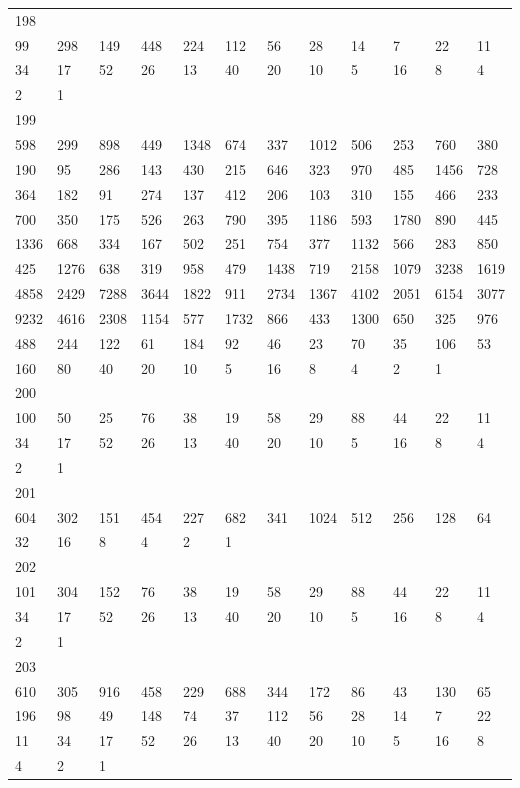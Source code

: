 \begin{longtable}{llllllllllll}
198&&&&&&&&&&&\\
99& 298& 149& 448& 224& 112& 56& 28& 14& 7& 22& 11\\
34& 17& 52& 26& 13& 40& 20& 10& 5& 16& 8& 4\\
2& 1& \\

199&&&&&&&&&&&\\
598& 299& 898& 449& 1348& 674& 337& 1012& 506& 253& 760& 380\\
190& 95& 286& 143& 430& 215& 646& 323& 970& 485& 1456& 728\\
364& 182& 91& 274& 137& 412& 206& 103& 310& 155& 466& 233\\
700& 350& 175& 526& 263& 790& 395& 1186& 593& 1780& 890& 445\\
1336& 668& 334& 167& 502& 251& 754& 377& 1132& 566& 283& 850\\
425& 1276& 638& 319& 958& 479& 1438& 719& 2158& 1079& 3238& 1619\\
4858& 2429& 7288& 3644& 1822& 911& 2734& 1367& 4102& 2051& 6154& 3077\\
9232& 4616& 2308& 1154& 577& 1732& 866& 433& 1300& 650& 325& 976\\
488& 244& 122& 61& 184& 92& 46& 23& 70& 35& 106& 53\\
160& 80& 40& 20& 10& 5& 16& 8& 4& 2& 1& \\

200&&&&&&&&&&&\\
100& 50& 25& 76& 38& 19& 58& 29& 88& 44& 22& 11\\
34& 17& 52& 26& 13& 40& 20& 10& 5& 16& 8& 4\\
2& 1& \\

201&&&&&&&&&&&\\
604& 302& 151& 454& 227& 682& 341& 1024& 512& 256& 128& 64\\
32& 16& 8& 4& 2& 1& \\

202&&&&&&&&&&&\\
101& 304& 152& 76& 38& 19& 58& 29& 88& 44& 22& 11\\
34& 17& 52& 26& 13& 40& 20& 10& 5& 16& 8& 4\\
2& 1& \\

203&&&&&&&&&&&\\
610& 305& 916& 458& 229& 688& 344& 172& 86& 43& 130& 65\\
196& 98& 49& 148& 74& 37& 112& 56& 28& 14& 7& 22\\
11& 34& 17& 52& 26& 13& 40& 20& 10& 5& 16& 8\\
4& 2& 1& \\


\end{longtable}
